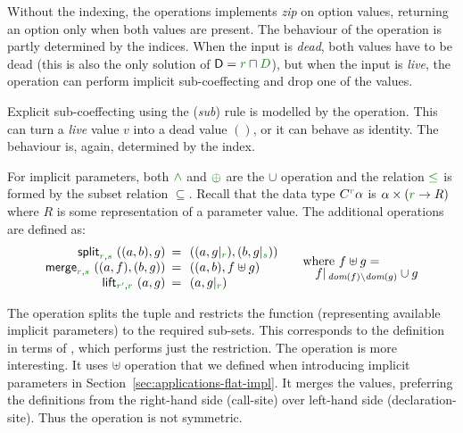 \noindent
Without the indexing, the  operations implements \emph{zip} on option values,
returning an option only when both values are present. The behaviour of the  
operation is partly determined by the indices. When the input is \emph{dead}, both values have 
to be dead (this is also the only solution of $\ident{D}=\cclrd{r}\sqcap\cclrd{D}$), but when
the input is \emph{live}, the operation can perform implicit sub-coeffecting and drop one of
the values.

Explicit sub-coeffecting using the (\emph{sub}) rule is modelled by the  operation.
This can turn a \emph{live} value $v$ into a dead value $()$, or it can behave as identity.
The behaviour is, again, determined by the index.

\begin{example}
For implicit parameters, both $\czip$ and $\cpar$ are the $\cup$ operation and the relation
$\cleq$ is formed by the subset relation $\subseteq$. Recall that the data type $\ctyp{\cclrd{r}}{\alpha}$
is $\alpha \times (\cclrd{r} \rightarrow R)$ where $R$ is some representation of a parameter value.
The additional operations are defined as:
%
\begin{equation*}
\begin{array}{rcl}
\ident{split}_{\cclrd{r}, \cclrd{s}}~((a,b), g) &\narrow{=}& ((a, \restr{g}{\cclrd{r}}), (b, \restr{g}{\cclrd{s}}))\\
\ident{merge}_{\cclrd{r}, \cclrd{s}}~((a, f), (b, g)) &\narrow{=}& ((a, b), f \uplus g)\\
\ident{lift}_{\cclrd{r'}, \cclrd{r}}~(a, g) &\narrow{=}& (a, \restr{g}{\cclrd{r}})\\
\end{array}
\quad
\begin{array}{l}
\textnormal{where}~f \uplus g = \\[-0.25em]
\quad\restr{f}{\, \textit{dom}(f) \setminus \textit{dom}(g)} \cup g 
\end{array}
\end{equation*}
\end{example}

\noindent
The  operation splits the tuple and restricts the function (representing available
implicit parameters) to the required sub-sets. This corresponds to the definition in terms
of , which performs just the restriction. The  operation is more 
interesting. It uses $\uplus$ operation that we defined when introducing implicit parameters
in Section~\ref{sec:applications-flat-impl}. It merges the values, preferring the definitions from
the right-hand side (call-site) over left-hand side (declaration-site). Thus the operation is not
symmetric.

